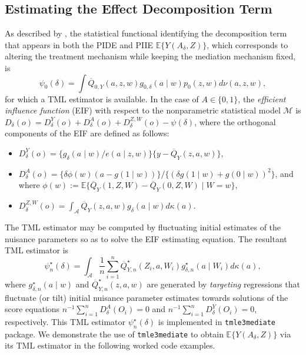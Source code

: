 \documentclass[
  12pt, krantz2,
]{krantz}
\newcommand{\passthrough}[1]{#1}
\providecommand{\tightlist}{%
  \setlength{\itemsep}{0pt}\setlength{\parskip}{0pt}}
\newcommand{\E}{\mathbb{E}}
\newcommand{\1}{\mathbbm{1}}
\theoremstyle{definition}
\theoremstyle{definition}
\theoremstyle{definition}
\theoremstyle{definition}
\theoremstyle{remark}
\begin{document}
\hypertarget{estimating-the-effect-decomposition-term}{%
\subsection{Estimating the Effect Decomposition Term}\label{estimating-the-effect-decomposition-term}}

As described by \citet{diaz2020causal}, the statistical functional identifying the
decomposition term that appears in both the PIDE and PIIE \(\E\{Y(A_{\delta}, Z)\}\), which corresponds to altering the treatment mechanism while keeping the
mediation mechanism fixed, is
\begin{equation*}
  \psi_0(\delta) = \int \overline{Q}_{0,Y}(a, z, w)
    g_{0,\delta}(a \mid w) p_0(z, w) d\nu(a, z, w),
\end{equation*}
for which a TML estimator is available. In the case of \(A \in \{0, 1\}\), the
\emph{efficient influence function} (EIF) with respect to the nonparametric
statistical model \(\mathcal{M}\) is \(D_{\delta}(o) = D^Y_{\delta}(o) + D^A_{\delta}(o) + D^{Z,W}_{\delta}(o) - \psi(\delta)\), where the
orthogonal components of the EIF are defined as follows:

\begin{itemize}
\tightlist
\item
  \(D^Y_{\delta}(o) = \{g_{\delta}(a \mid w) / e(a \mid z, w)\} \{y - \overline{Q}_{Y}(z,a,w)\}\),
\item
  \(D^A_{\delta}(o) = \{\delta\phi(w) (a - g(1 \mid w))\} / \{(\delta g(1 \mid w) + g(0 \mid w))^2\}\), and where \(\phi(w) := \E\{\overline{Q}_{Y}(1, Z, W) - \overline{Q}_{Y}(0, Z, W) \mid W = w\}\),
\item
  \(D^{Z,W}_{\delta}(o) = \int_{\mathcal{A}} \overline{Q}_{Y}(z, a, w) g_{\delta}(a \mid w) d\kappa(a)\).
\end{itemize}

The TML estimator may be computed by fluctuating initial estimates of the
nuisance parameters so as to solve the EIF estimating equation. The resultant
TML estimator is
\begin{equation*}
  \psi_{n}^{\star}(\delta) = \int_{\mathcal{A}} \frac{1}{n} \sum_{i=1}^n
  \overline{Q}_{Y,n}^{\star}(Z_i, a, W_i)
  g_{\delta, n}^{\star}(a \mid W_i) d\kappa(a),
\end{equation*}
where \(g_{\delta,n}^{\star}(a \mid w)\) and \(\overline{Q}_{Y,n}^{\star}(z,a,w)\)
are generated by \textit{targeting} regressions that fluctuate (or tilt) initial
nuisance parameter estimates towards solutions of the score equations \(n^{-1} \sum_{i=1}^n D^A_{\delta}(O_i) = 0\) and \(n^{-1} \sum_{i=1}^n D^Y_{\delta}(O_i) = 0\), respectively. This TML estimator \(\psi_{n}^{\star}(\delta)\) is implemented
in \passthrough{\lstinline!tmle3mediate!} package. We demonstrate the use of \passthrough{\lstinline!tmle3mediate!} to obtain
\(\E\{Y(A_{\delta}, Z)\}\) via its TML estimator in the following worked code
examples.
\end{document}
